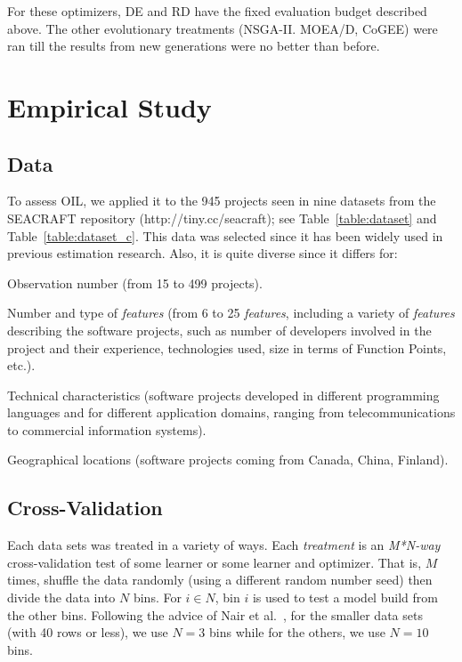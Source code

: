 For these optimizers, DE and RD have the fixed evaluation budget  described above.
The other evolutionary treatments       (NSGA-II. MOEA/D, CoGEE)  were ran
till  the results from new generations were no better than before.

\section{Empirical Study} \label{sect:study} 

\subsection{Data}

To assess OIL, we applied it to the 945 projects
seen in nine    datasets from the SEACRAFT repository (http://tiny.cc/seacraft); see Table~\ref{table:dataset} and Table~\ref{table:dataset_c}. 
This data was selected since it has been  widely  used in previous estimation research.
Also, it  is quite diverse since it differs for:
\bi
\item
Observation number (from 15 to 499 projects). 
\item
Number and type of {\em features} (from 6 to 25 {\em features}, including a variety of {\em features} describing the software projects, such as number of developers involved in the project and their experience, technologies used, size in terms of Function Points, etc.).
\item
Technical characteristics (software projects developed in different programming languages and for different application domains, ranging from telecommunications to commercial information systems).
\item
Geographical locations (software projects coming from Canada, China, Finland). 
\ei


\subsection{Cross-Validation}

Each data sets was treated in a variety of  ways. Each {\em treatment} is an {\em M*N-way} cross-validation test of some learner or some learner and optimizer. That is, $M$ times,  shuffle the data randomly (using a different random number seed)
then divide the data into $N$ bins.
For $i   \in N$, bin $i$ is used to test a model
build from the other bins.
Following the advice
of Nair et al.~\cite{nair18}, for the smaller data sets (with 40 rows or less), we  use $N=3$  bins
while for the others, we use $N=10$ bins.   

